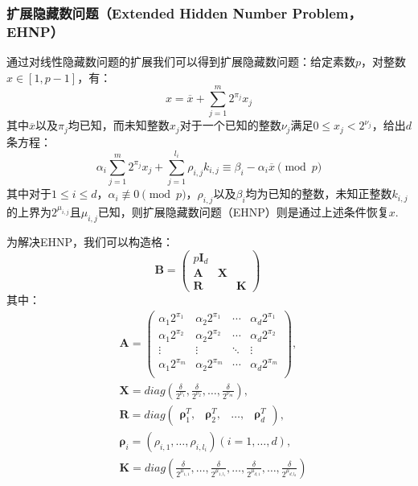\documentclass{book}
\numberwithin{equation}{subsubsection}
\begin{document}
\subsubsection{扩展隐藏数问题（Extended Hidden Number Problem，EHNP）\cite{19}}
通过对线性隐藏数问题的扩展我们可以得到扩展隐藏数问题：给定素数$p$，对整数$x\in[1,p-1]$，有：
\begin{equation}
    x=\overline{x}+\sum_{j=1}^{m}2^{\pi_{j}}x_j
    \nonumber
\end{equation}
其中$\overline{x}$以及$\pi_j$均已知，而未知整数$x_j$对于一个已知的整数$\nu_j$满足$0\le x_{j}<2^{\nu_j}$，给出$d$条方程：
\begin{equation}
    \alpha_i\sum_{j=1}^{m}2^{\pi_j}x_j+\sum_{j=1}^{l_i}{\rho_{i,j}k_{i,j}}\equiv\beta_{i}-\alpha_i\overline{x}\pmod{p}
    \nonumber
\end{equation}
其中对于$1\le i\le d$，$\alpha_i\not\equiv 0\pmod{p}$，$\rho_{i,j}$以及$\beta_i$均为已知的整数，未知正整数$k_{i,j}$的上界为$2^{\mu_{i,j}}$且$\mu_{i,j}$已知，则扩展隐藏数问题（EHNP）则是通过上述条件恢复$x$.\par
为解决EHNP，我们可以构造格：
\begin{equation}
    \pmb{B}=\left(\begin{matrix}
        p\pmb{I}_d&&\\
        \pmb{A}&\pmb{X}&\\
        \pmb{R}&&\pmb{K}
    \end{matrix}\right)\
    \nonumber
\end{equation}
其中：
\begin{equation}
    \begin{aligned}
        &\pmb{A}=\left(\begin{matrix}
            \alpha_{1}2^{\pi_1}&\alpha_{2}2^{\pi_1}&\cdots&\alpha_{d}2^{\pi_1}\\
            \alpha_{1}2^{\pi_2}&\alpha_{2}2^{\pi_2}&\cdots&\alpha_{d}2^{\pi_2}\\
            \vdots&\vdots&\ddots&\vdots\\
            \alpha_{1}2^{\pi_m}&\alpha_{2}2^{\pi_m}&\cdots&\alpha_{d}2^{\pi_m}\\
        \end{matrix}\right),\\
        &\pmb{X}=diag\left(\frac{\delta}{2^{\nu_{1}}},\frac{\delta}{2^{\nu_{2}}},\ldots,\frac{\delta}{2^{\nu_{m}}}\right),\\
        &\pmb{R}=diag\left(\begin{matrix}
            \pmb{\rho}_1^T,&\pmb{\rho}_2^T,&\ldots,&\pmb{\rho}_d^T
        \end{matrix}\right),\\
        &\pmb{\rho}_i=(\rho_{i,1},\ldots,\rho_{i,l_i})(i=1,\ldots,d),\\
        &\pmb{K}=diag\left(\frac{\delta}{2^{\mu_{1,1}}},\ldots,\frac{\delta}{2^{\mu_{1,l_{1}}}},\ldots,\frac{\delta}{2^{\mu_{d,1}}},\ldots,\frac{\delta}{2^{\mu_{d,l_d}}}\right)
    \end{aligned}
    \nonumber
\end{equation}
\end{document}
